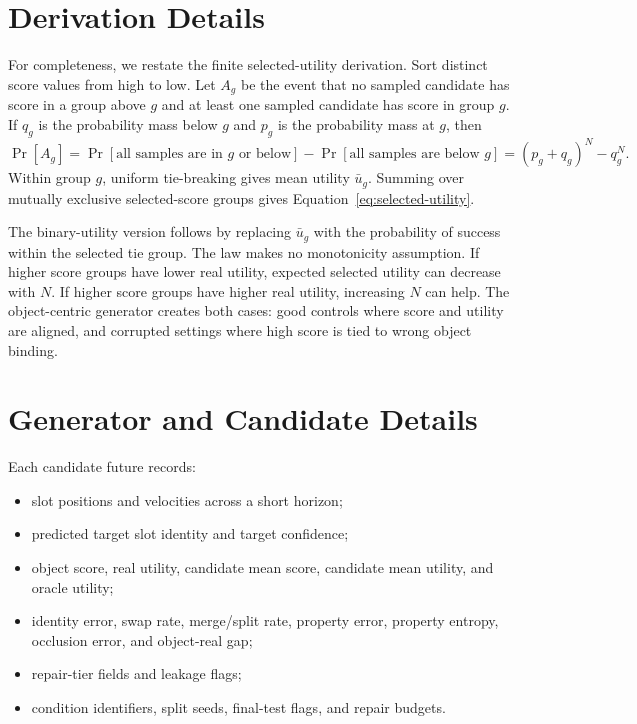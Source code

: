 \documentclass[10pt]{article}
\begin{document}
\clearpage
\appendix

\section{Derivation Details}
\label{app:law}

For completeness, we restate the finite selected-utility derivation. Sort distinct score values from high to low. Let $A_g$ be the event that no sampled candidate has score in a group above $g$ and at least one sampled candidate has score in group $g$. If $q_g$ is the probability mass below $g$ and $p_g$ is the probability mass at $g$, then
\[
  \Pr[A_g] = \Pr[\textrm{all samples are in }g\textrm{ or below}]
             - \Pr[\textrm{all samples are below }g]
           = (p_g+q_g)^N-q_g^N.
\]
Within group $g$, uniform tie-breaking gives mean utility $\bar{u}_g$. Summing over mutually exclusive selected-score groups gives Equation~\ref{eq:selected-utility}.

The binary-utility version follows by replacing $\bar{u}_g$ with the probability of success within the selected tie group. The law makes no monotonicity assumption. If higher score groups have lower real utility, expected selected utility can decrease with $N$. If higher score groups have higher real utility, increasing $N$ can help. The object-centric generator creates both cases: good controls where score and utility are aligned, and corrupted settings where high score is tied to wrong object binding.

\section{Generator and Candidate Details}
\label{app:generator}

Each candidate future records:
\begin{itemize}
  \item slot positions and velocities across a short horizon;
  \item predicted target slot identity and target confidence;
  \item object score, real utility, candidate mean score, candidate mean utility, and oracle utility;
  \item identity error, swap rate, merge/split rate, property error, property entropy, occlusion error, and object-real gap;
  \item repair-tier fields and leakage flags;
  \item condition identifiers, split seeds, final-test flags, and repair budgets.
\end{itemize}
\end{document}
